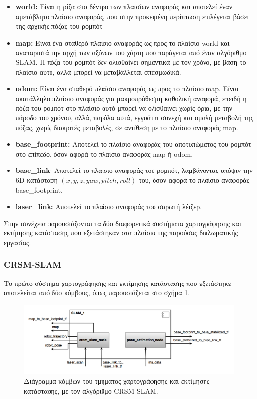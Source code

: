 \begin{itemize}
	\item \textbf{world:} Είναι η ρίζα στο δέντρο των πλαισίων αναφοράς και αποτελεί έναν αμετάβλητο πλαίσιο αναφοράς, που στην προκειμένη περίπτωση επιλέγεται βάσει της αρχικής πόζας του ρομπότ.
	\item \textbf{map:} Είναι ένα σταθερό πλαίσιο αναφοράς ως προς το πλαίσιο world και αναπαριστά την αρχή των αξόνων του χάρτη που παράγεται από έναν αλγόριθμο SLAM. Η πόζα του ρομπότ δεν ολισθαίνει σημαντικά με τον χρόνο, με βάση το πλαίσιο αυτό, αλλά μπορεί να μεταβάλλεται σπασμωδικά.
	\item \textbf{odom:} Είναι ένα σταθερό πλαίσιο αναφοράς ως προς το πλαίσιο map. Είναι ακατάλληλο πλαίσιο αναφοράς για μακροπρόθεσμη καθολική αναφορά, επειδή η πόζα του ρομπότ στο πλαίσιο αυτό μπορεί να ολισθαίνει χωρίς όρια, με την πάροδο του χρόνου, αλλά, παρόλα αυτά, εγγυάται συνεχή και ομαλή μεταβολή της πόζας, χωρίς διακριτές μεταβολές, σε αντίθεση με το πλαίσιο αναφοράς map.
	\item \textbf{base{\_}footprint:} Αποτελεί το πλαίσιο αναφοράς του αποτυπώματος του ρομπότ στο επίπεδο, όσον αφορά το πλαίσιο αναφοράς map ή odom.
	\item \textbf{base{\_}link:} Αποτελεί το πλαίσιο αναφοράς του ρομπότ, λαμβάνοντας υπόψιν την 6D κατάσταση $(x,y,z,yaw,pitch,roll)$ του, όσον αφορά το πλαίσιο αναφοράς base{\_}footprint.
	\item \textbf{laser{\_}link:} Αποτελεί το πλαίσιο αναφοράς του σαρωτή λέιζερ.
\end{itemize}

\bigskip Στην συνέχεια παρουσιάζονται τα δύο διαφορετικά συστήματα χαρτογράφησης και εκτίμησης κατάστασης που εξετάστηκαν στα πλαίσια της παρούσας διπλωματικής εργασίας.

\subsubsection{CRSM-SLAM}
Το πρώτο σύστημα χαρτογράφησης και εκτίμησης κατάστασης που εξετάστηκε αποτελείται από δύο κόμβους, όπως παρουσιάζεται στο σχήμα \ref{fig:slam_1_component_diagram}.

\begin{figure}[!ht]
	\centering
	\includegraphics[width=\linewidth]{Chapters/Chapter4/Figures/slam_1_component_diagram.png}
	\caption{Διάγραμμα κόμβων του τμήματος χαρτογράφησης και εκτίμησης κατάστασης, με τον αλγόριθμο CRSM-SLAM.}
	\label{fig:slam_1_component_diagram}
\end{figure}


